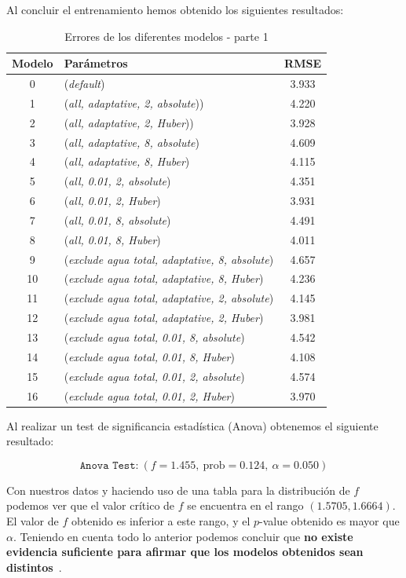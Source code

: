 \documentclass[12pt]{report} %
\begin{document}
 Al concluir el entrenamiento hemos obtenido los siguientes resultados:
\begin{table}[H]
\begin{center}
\begin{tabular}{ |c|l|c| }
    \hline
    Modelo & Parámetros & RMSE\\
    \hline
    \hline
    0 & (\textit{default})  & 3.933\\
    1 & (\textit{all, adaptative, 2, absolute}))  & 4.220\\
    2 & (\textit{all, adaptative, 2, Huber}))  & 3.928\\
    3 & (\textit{all, adaptative, 8, absolute})  & 4.609\\
    4 & (\textit{all, adaptative, 8, Huber})  & 4.115\\
    5 & (\textit{all, 0.01, 2, absolute})  & 4.351\\
    6 & (\textit{all, 0.01, 2, Huber})  & 3.931\\
    7 & (\textit{all, 0.01, 8, absolute})  & 4.491\\
    8 & (\textit{all, 0.01, 8, Huber})  & 4.011\\
    9 & (\textit{exclude agua total, adaptative, 8, absolute})  & 4.657\\
    10 & (\textit{exclude agua total, adaptative, 8, Huber})  & 4.236\\
    11 & (\textit{exclude agua total, adaptative, 2, absolute})  & 4.145\\
    12 & (\textit{exclude agua total, adaptative, 2, Huber})  & 3.981\\
    13 & (\textit{exclude agua total, 0.01, 8, absolute})  & 4.542\\
    14 & (\textit{exclude agua total, 0.01, 8, Huber})  & 4.108\\
    15 & (\textit{exclude agua total, 0.01, 2, absolute})  & 4.574\\
    16 & (\textit{exclude agua total, 0.01, 2, Huber})  & 3.970\\
    \hline
\end{tabular}
\caption{Errores de los diferentes modelos - parte 1}
\end{center}
\end{table}

    Al realizar un test de significancia estadística (Anova) obtenemos el siguiente resultado:

$$\texttt{Anova Test:}~(f=1.455,~\text{prob}=0.124,~\alpha=0.050)$$

Con nuestros datos y haciendo uso de una tabla para la distribución de $f$~\cite{f-distro} podemos ver que el valor crítico de $f$ se encuentra en el rango $(1.5705, 1.6664)$. El valor de $f$ obtenido es inferior a este rango, y el $p$-value obtenido es mayor que $\alpha$. Teniendo en cuenta todo lo anterior podemos concluir que \textbf{no existe evidencia suficiente para afirmar que los modelos obtenidos sean distintos}~\cite{anova-RM}.
\end{document}
